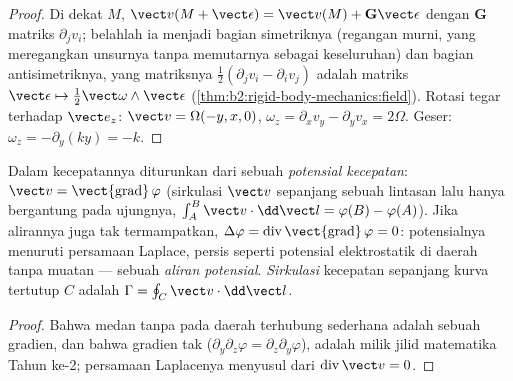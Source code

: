 \begin{proof}
Di dekat $M$, $\vect v(M + \vect\epsilon) = \vect v(M) + \mathbf G\vect\epsilon$ dengan
$\mathbf G$ matriks $\partial_jv_i$; belahlah ia menjadi bagian simetriknya
(regangan murni, yang meregangkan unsurnya tanpa memutarnya sebagai
keseluruhan) dan bagian antisimetriknya, yang matriksnya $\tfrac12(\partial_jv_i -
\partial_iv_j)$ adalah matriks $\vect\epsilon \mapsto \tfrac12\vect\omega\wedge\vect\epsilon$
(\cref{thm:b2:rigid-body-mechanics:field}). Rotasi tegar terhadap $\vect e_z$:
$\vect v = \Omega(-y, x, 0)$, $\omega_z = \partial_xv_y - \partial_yv_x = 2\Omega$.
Geser: $\omega_z = -\partial_y(ky) = -k$.
\end{proof}

\begin{definition}\label{def:b2:fluid-kinematics:potential}
Dalam  kecepatannya diturunkan dari sebuah \emph{potensial
kecepatan}: $\vect v = \operatorname{\vect{grad}}\varphi$ (sirkulasi
$\vect v$ sepanjang sebuah lintasan lalu hanya bergantung pada ujungnya, $\int_A^B\vect v
\cdot\dd\vect l = \varphi(B) - \varphi(A)$). Jika alirannya juga tak
termampatkan, $\Delta\varphi = \operatorname{div}\operatorname{\vect{grad}}
\varphi = 0$: potensialnya menuruti persamaan Laplace, persis seperti
potensial elektrostatik di daerah tanpa muatan --- sebuah \emph{aliran
potensial}. \emph{Sirkulasi} kecepatan sepanjang kurva tertutup $C$
adalah $\Gamma = \oint_C\vect v\cdot\dd\vect l$.
\end{definition}

\begin{proof}
Bahwa medan tanpa  pada daerah terhubung sederhana adalah sebuah
gradien, dan bahwa gradien tak  ($\partial_y\partial_z\varphi = \partial_z\partial_y\varphi$),
adalah milik jilid matematika Tahun ke-2; persamaan Laplacenya menyusul dari
$\operatorname{div}\vect v = 0$.
\end{proof}

